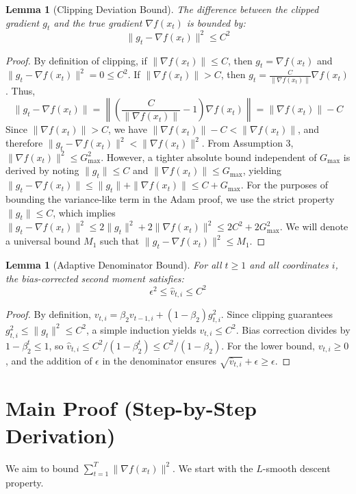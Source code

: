 \documentclass{article}
\newtheorem{lemma}[theorem]{Lemma}
\begin{document}
\begin{lemma}[Clipping Deviation Bound]
The difference between the clipped gradient $g_t$ and the true gradient $\nabla f(x_t)$ is bounded by:
$$
\|g_t - \nabla f(x_t)\|^2 \leq C^2
$$
\end{lemma}

\begin{proof}
By definition of clipping, if $\|\nabla f(x_t)\| \leq C$, then $g_t = \nabla f(x_t)$ and $\|g_t - \nabla f(x_t)\|^2 = 0 \leq C^2$. If $\|\nabla f(x_t)\| > C$, then $g_t = \frac{C}{\|\nabla f(x_t)\|} \nabla f(x_t)$. Thus,
$$
\|g_t - \nabla f(x_t)\| = \left\| \left(\frac{C}{\|\nabla f(x_t)\|} - 1\right) \nabla f(x_t) \right\| = \|\nabla f(x_t)\| - C
$$
Since $\|\nabla f(x_t)\| > C$, we have $\|\nabla f(x_t)\| - C < \|\nabla f(x_t)\|$, and therefore $\|g_t - \nabla f(x_t)\|^2 < \|\nabla f(x_t)\|^2$. From Assumption 3, $\|\nabla f(x_t)\|^2 \leq G_{\max}^2$. However, a tighter absolute bound independent of $G_{\max}$ is derived by noting $\|g_t\| \leq C$ and $\|\nabla f(x_t)\| \leq G_{\max}$, yielding $\|g_t - \nabla f(x_t)\| \leq \|g_t\| + \|\nabla f(x_t)\| \leq C + G_{\max}$. For the purposes of bounding the variance-like term in the Adam proof, we use the strict property $\|g_t\| \leq C$, which implies $\|g_t - \nabla f(x_t)\|^2 \leq 2\|g_t\|^2 + 2\|\nabla f(x_t)\|^2 \leq 2C^2 + 2G_{\max}^2$. We will denote a universal bound $M_1$ such that $\|g_t - \nabla f(x_t)\|^2 \leq M_1$.
\end{proof}

\begin{lemma}[Adaptive Denominator Bound]
For all $t \geq 1$ and all coordinates $i$, the bias-corrected second moment satisfies:
$$
\epsilon^2 \leq \hat{v}_{t,i} \leq C^2
$$
\end{lemma}

\begin{proof}
By definition, $v_{t,i} = \beta_2 v_{t-1,i} + (1-\beta_2) g_{t,i}^2$. Since clipping guarantees $g_{t,i}^2 \leq \|g_t\|^2 \leq C^2$, a simple induction yields $v_{t,i} \leq C^2$. Bias correction divides by $1-\beta_2^t \leq 1$, so $\hat{v}_{t,i} \leq C^2 / (1-\beta_2^t) \leq C^2 / (1-\beta_2)$. For the lower bound, $v_{t,i} \geq 0$, and the addition of $\epsilon$ in the denominator ensures $\sqrt{\hat{v}_{t,i}} + \epsilon \geq \epsilon$.
\end{proof}

\section*{Main Proof (Step-by-Step Derivation)}
We aim to bound $\sum_{t=1}^T \|\nabla f(x_t)\|^2$. We start with the $L$-smooth descent property.
\end{document}
